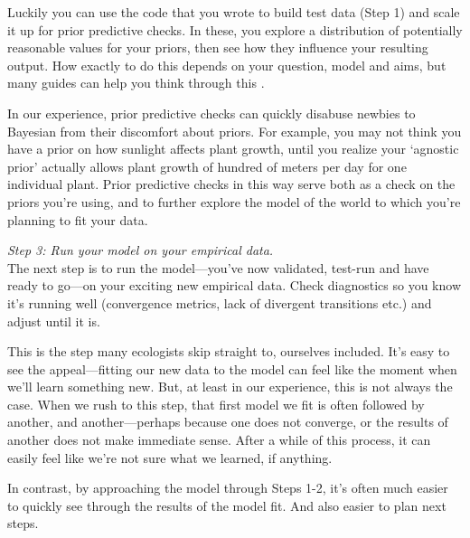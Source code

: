 \documentclass[11pt]{article}
\begin{document}
Luckily you can use the code that you wrote to build test data (Step 1) and scale it up for prior predictive checks. In these, you explore a distribution of potentially reasonable values for your priors, then see how they influence your resulting output. How exactly to do this depends on your question, model and aims, but many guides can help you think through this \citep{betanprior,wesner2021,winter2023}. 

In our experience, prior predictive checks can quickly disabuse newbies to Bayesian from their discomfort about priors. For example, you may not think you have a prior on how sunlight affects plant growth, until you realize your `agnostic prior' actually allows plant growth of hundred of meters per day for one individual plant. Prior predictive checks in this way serve both as a check on the priors you're using, and to further explore the model of the world to which you're planning to fit your data. 
 
 \emph{Step 3: Run your model on your empirical data.} \\
The next step is to run the model---you've now validated, test-run and have ready to go---on your exciting new empirical data. Check diagnostics so you know it's running well (convergence metrics, lack of divergent transitions etc.) and adjust until it is. 
 
This is the step many ecologists skip straight to, ourselves included. It's easy to see the appeal---fitting our new data to the model can feel like the moment when we'll learn something new. But, at least in our experience, this is not always the case. When we rush to this step, that first model we fit is often followed by another, and another---perhaps because one does not converge, or the results of another does not make immediate sense. After a while of this process, it can easily feel like we're not sure what we learned, if anything. 
 
 In contrast, by approaching the model through Steps 1-2, it's often much easier to quickly see through the results of the model fit. And also easier to plan next steps. 
 
\end{document}
